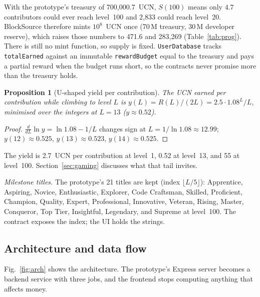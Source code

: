 \documentclass[conference]{IEEEtran}
\newtheorem{proposition}{Proposition}
\begin{document}
With the prototype's treasury of 700{,}000.7~UCN, $S(100)$ means only $4.7$ contributors could ever reach level~100 and 2{,}833 could reach level~20. BlockSource therefore mints $10^{8}$~UCN once (70\,M treasury, 30\,M developer reserve), which raises those numbers to 471.6 and 283{,}269 (Table~\ref{tab:prog}). There is still no mint function, so supply is fixed. \texttt{UserDatabase} tracks \texttt{totalEarned} against an immutable \texttt{rewardBudget} equal to the treasury and pays a partial reward when the budget runs short, so the contracts never promise more than the treasury holds.

\begin{proposition}[U-shaped yield per contribution]\label{prop:yield}
The UCN earned per contribution while climbing to level $L$ is $y(L) = R(L)/(2L) = 2.5 \cdot 1.08^{L}/L$, minimised over the integers at $L = 13$ ($y \approx 0.52$).
\end{proposition}
\begin{proof}
$\frac{d}{dL}\ln y = \ln 1.08 - 1/L$ changes sign at $L = 1/\ln 1.08 \approx 12.99$; $y(12) \approx 0.525$, $y(13) \approx 0.523$, $y(14) \approx 0.525$.
\end{proof}
The yield is 2.7~UCN per contribution at level~1, 0.52 at level~13, and 55 at level~100. Section~\ref{sec:gaming} discusses what that tail invites.

\textit{Milestone titles.} The prototype's 21 titles are kept (index $\lfloor L/5 \rfloor$): Apprentice, Aspiring, Novice, Enthusiastic, Explorer, Code Craftsman, Skilled, Proficient, Champion, Quality, Expert, Professional, Innovative, Veteran, Rising, Master, Conqueror, Top Tier, Insightful, Legendary, and Supreme at level~100. The contract exposes the index; the UI holds the strings.

\subsection{Architecture and data flow}
Fig.~\ref{fig:arch} shows the architecture. The prototype's Express server becomes a backend service with three jobs, and the frontend stops computing anything that affects money.
\end{document}
